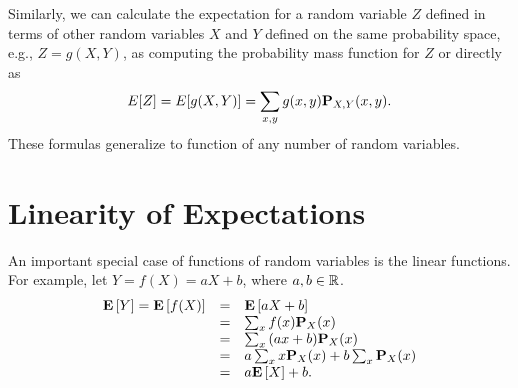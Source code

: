 \begin{gram}
Similarly, we can calculate the expectation for a random variable $Z$
defined in terms of other random variables $X$ and $Y$ defined on the
same probability space, e.g., $Z = g(X,Y)$, as computing the
probability mass function for $Z$ or directly as
\[
E[Z] = E[g(X,Y)] = \sum_{x,y}{g(x,y) \mathbf{P}_{X,Y}(x,y)}.
\] 
These formulas generalize to function of any number of random
variables.
\end{gram}

\section{Linearity of Expectations}
\label{sec:probability::expectation::linearity}

\begin{gram}
An important special case of functions of random variables is the
linear functions.  For example, let $Y = f(X) = aX + b$, where $a, b
\in \mathbb{R}$.
%
\[
\begin{array}{lll}
\mathbf{E}\left[{Y}\right] = \mathbf{E}\left[{f(X)}\right] 
& = & \mathbf{E}\left[{aX + b}\right] 
\\
& = & \sum_{x}{f(x) \mathbf{P}_{X}(x)}
\\
& = & \sum_{x}{(ax + b) \mathbf{P}_{X}(x)}
\\
& = & a\sum_{x}{x\mathbf{P}_{X}(x)} + b\sum_{x}{\mathbf{P}_{X}(x)}
\\
& = & a\mathbf{E}\left[{X}\right] + b.
\end{array}
\]
\end{gram}

